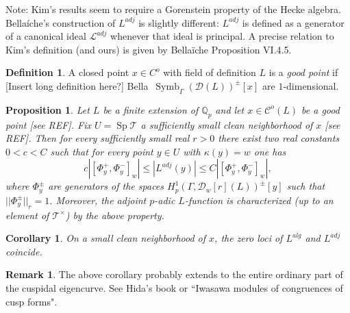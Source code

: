 \documentclass[10pt]{amsart}
\theoremstyle{plain}
\newtheorem{proposition}[theorem]{Proposition}
\newtheorem{corollary}[theorem]{Corollary}
\theoremstyle{definition}
\newtheorem{definition}[theorem]{Definition}
\newtheorem{remark}[theorem]{Remark}
\newcommand{\QQ}{{\mathbb{Q}}}
\newcommand{\cD}{\mathcal{D}}
\DeclareMathOperator{\Symb}{Symb}
\DeclareMathOperator{\Sp}{Sp}
\begin{document}
Note: Kim's results seem to require a Gorenstein property of the Hecke algebra. Bella\'iche's construction of $L^{adj}$ is slightly different: $L^{adj}$ is defined as a generator of a canonical ideal $\mathcal{L}^{adj}$ whenever that ideal is principal. A precise relation to Kim's definition (and ours) is given by Bella\"iche Proposition VI.4.5.

\begin{definition}
A closed point $x\in C^o$ with field of definition $L$ is a \emph{good point} if [Insert long definition here?]
Bella\ $\Symb_\Gamma(\cD(L))^\pm[x]$ are $1$-dimensional.
\end{definition}

\begin{proposition}
Let $L$ be a finite extension of $\QQ_p$ and let $x\in \mathcal{C}^o(L)$ be a good point [see REF]. Fix $U=\Sp\mathcal{T}$ a sufficiently small clean neighborhood of $x$ [see REF]. Then for every sufficiently small real $r>0$ there exist two real constants $0<c<C$ such that for every point $y\in U$ with $\kappa(y)=w$ one has
\begin{equation}
	c| [\Phi_{y}^+, \Phi_y^-]_w | \leq |L^{adj}(y) | \leq C | [\Phi_y^+, \Phi_y^-]_w|,
\end{equation}
where $\Phi_{y}^\pm$ are generators of the spaces $H^1_p(\Gamma,\cD_w[r](L))^{\pm}[y]$ such that $||\Phi_y^\pm||_r = 1$. Moreover, the adjoint $p$-adic $L$-function is characterized (up to an element of $\mathcal{T}^\times$) by the above property.
\end{proposition}

\begin{corollary}
On a small clean neighborhood of $x$, the zero loci of $L^{alg}$ and $L^{adj}$ coincide.
\end{corollary}

\begin{remark}
The above corollary probably extends to the entire ordinary part of the cuspidal eigencurve. See Hida's book or ``Iwasawa modules of congruences of cusp forms".
\end{remark}
\end{document}
